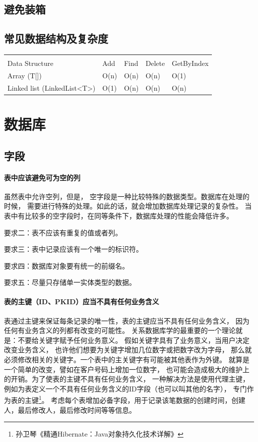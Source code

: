 \documentclass{book}
\begin{document}
\subsection{避免装箱}

\subsection{常见数据结构及复杂度}

\begin{tabular}{l|l|l|l|l}
	\multirow{1}{*}{}			
	& \multicolumn{1}{c}{}
	& \multicolumn{1}{c}{}
	& \multicolumn{1}{c}{}
	& \multicolumn{1}{c}{}\\
	Data Structure & Add & Find & Delete & GetByIndex\\
	\hline
	Array (T[]) & O(n) & O(n) & O(n) & O(1)\\
	\hline
	Linked list (LinkedList<T>) & O(1) & O(n) & O(n) & O(n)\\
\end{tabular}


\section{数据库}

\subsection{字段}

\paragraph{表中应该避免可为空的列}虽然表中允许空列，但是，
空字段是一种比较特殊的数据类型。数据库在处理的时候，
需要进行特殊的处理。如此的话，就会增加数据库处理记录的复杂性。
当表中有比较多的空字段时，在同等条件下，数据库处理的性能会降低许多。

要求二：表不应该有重复的值或者列。

要求三：表中记录应该有一个唯一的标识符。

要求四：数据库对象要有统一的前缀名。

要求五：尽量只存储单一实体类型的数据。

\paragraph{表的主键（ID、PKID）应当不具有任何业务含义}

表通过主键来保证每条记录的唯一性，表的主键应当不具有任何业务含义，
因为任何有业务含义的列都有改变的可能性。
关系数据库学的最重要的一个理论就是：不要给关键字赋予任何业务意义。
假如关键字具有了业务意义，当用户决定改变业务含义，
也许他们想要为关键字增加几位数字或把数字改为字母，
那么就必须修改相关的关键字。一个表中的主关键字有可能被其他表作为外键。
就算是一个简单的改变，譬如在客户号码上增加一位数字，
也可能会造成极大的维护上的开销。为了使表的主键不具有任何业务含义，
一种解决方法是使用代理主键，
例如为表定义一个不具有任何业务含义的ID字段（也可以叫其他的名字），
专门作为表的主键\footnote{孙卫琴《精通Hibernate：Java对象持久化技术详解》}。
考虑每个表增加必备字段，用于记录该笔数据的创建时间，创建人，最后修改人，最后修改时间等等信息。
\end{document}
